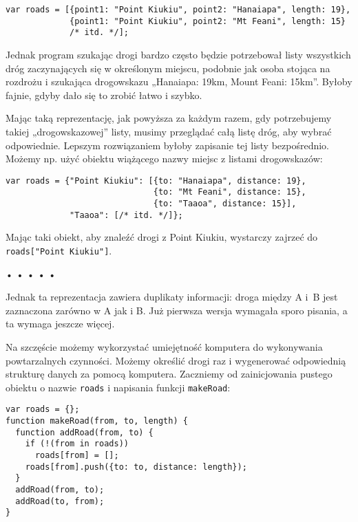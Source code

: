   
\begin{verbatim} 
var roads = [{point1: "Point Kiukiu", point2: "Hanaiapa", length: 19},
             {point1: "Point Kiukiu", point2: "Mt Feani", length: 15}
             /* itd. */];
 \end{verbatim}
  
Jednak program szukając drogi bardzo często będzie potrzebował listy wszystkich dróg zaczynających się w określonym miejscu, podobnie jak osoba stojąca na rozdrożu i szukająca drogowskazu „Hanaiapa: 19km, Mount Feani: 15km”. Byłoby fajnie, gdyby dało się to zrobić łatwo i szybko.

  
Mając taką reprezentację, jak powyższa za każdym razem, gdy potrzebujemy takiej „drogowskazowej” listy, musimy przeglądać całą listę dróg, aby wybrać odpowiednie. Lepszym rozwiązaniem byłoby zapisanie tej listy bezpośrednio. Możemy np. użyć obiektu wiążącego nazwy miejsc z listami drogowskazów:

  
\begin{verbatim} 
var roads = {"Point Kiukiu": [{to: "Hanaiapa", distance: 19},
                              {to: "Mt Feani", distance: 15},
                              {to: "Taaoa", distance: 15}],
             "Taaoa": [/* itd. */]};
 \end{verbatim}
  
Mając taki obiekt, aby znaleźć drogi z Point Kiukiu, wystarczy zajrzeć do \texttt{roads["Point Kiukiu"]}.



\begin{center}
• • • • •
\end{center}

  
Jednak ta reprezentacja zawiera duplikaty informacji: droga między A i~B jest zaznaczona zarówno w A jak i B. Już pierwsza wersja wymagała sporo pisania, a ta wymaga jeszcze więcej.

  
Na szczęście możemy wykorzystać umiejętność komputera do wykonywania powtarzalnych czynności. Możemy określić drogi raz i wygenerować odpowiednią strukturę danych za pomocą komputera. Zaczniemy od zainicjowania pustego obiektu o nazwie \texttt{roads} i napisania funkcji \texttt{makeRoad}:

  
\begin{verbatim} 
var roads = {};
function makeRoad(from, to, length) {
  function addRoad(from, to) {
    if (!(from in roads))
      roads[from] = [];
    roads[from].push({to: to, distance: length});
  }
  addRoad(from, to);
  addRoad(to, from);
}
 \end{verbatim}
  
